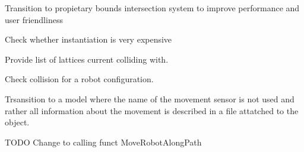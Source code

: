 
\begin{DoxyRefList}
\item[Class \mbox{\hyperlink{class_illa_node_sensor_script}{Illa\+Node\+Sensor\+Script}} ]\label{todo__todo000001}%
%
Transition to propietary bounds intersection system to improve performance and user friendliness  
\item[Member \mbox{\hyperlink{class_inchworm_robot_controller_a434da4643498bd898d99a63678492ae4}{Inchworm\+Robot\+Controller.Is\+Pose\+Colliding}} (\mbox{\hyperlink{class_pos_j}{PosJ}} Pose\+To\+Check)]\label{todo__todo000002}%
%
Check whether instantiation is very expensive

\label{todo__todo000003}%
%
Provide list of lattices current colliding with.

\label{todo__todo000004}%
%
Check collision for a robot configuration.  
\item[Member \mbox{\hyperlink{class_robot_script_aaaacc0eacd09c68f0e399dfb780c16a3}{Robot\+Script.Get\+Possible\+Movement\+Sensors}} ()]\label{todo__todo000005}%
%
Trsansition to a model where the name of the movement sensor is not used and rather all information about the movement is described in a file attatched to the object. ~\newline
  
\item[Member \mbox{\hyperlink{class_robot_script_a9213947f626c88acf4ce793020a9ef3d}{Robot\+Script.Move\+To\+Node}} (Game\+Object End\+Node)]\label{todo__todo000006}%
%
TODO Change to calling funct Move\+Robot\+Along\+Path 
\end{DoxyRefList}